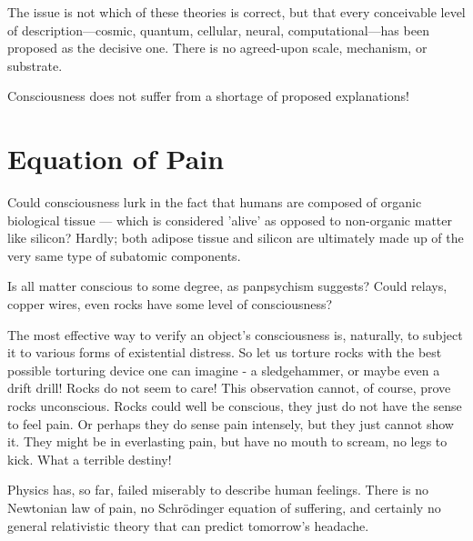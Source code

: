 The issue is not which of these theories is correct, but that every conceivable level of description—cosmic, quantum, cellular, neural, 
computational—has been proposed as the decisive one. There is no agreed-upon scale, mechanism, or substrate. 

Consciousness does not suffer from a shortage of proposed explanations!


\section{Equation of Pain}

Could consciousness lurk in the fact that humans are composed of organic biological tissue — which is considered 'alive' as opposed to non-organic matter like silicon? Hardly; both adipose tissue and silicon are ultimately made up of the very same type of subatomic components.

Is all matter conscious to some degree, as panpsychism suggests? Could relays, copper wires, even rocks have some level of consciousness?

The most effective way to verify an object's consciousness is, naturally, to subject it to various forms of existential distress.
So let us torture rocks with the best possible torturing device one can imagine - a sledgehammer, or maybe even a drift drill!
Rocks do not seem to care! This observation cannot, of course, prove rocks unconscious. Rocks could well be conscious, 
they just do not have the sense to feel pain. Or perhaps they do sense pain intensely, but they just cannot show it. 
They might be in everlasting pain, but have no mouth to scream, no legs to kick. What a terrible destiny!

Physics has, so far, failed miserably to describe human feelings. There is no Newtonian law of pain, no Schrödinger equation of suffering,
and certainly no general relativistic theory that can predict tomorrow’s headache.


